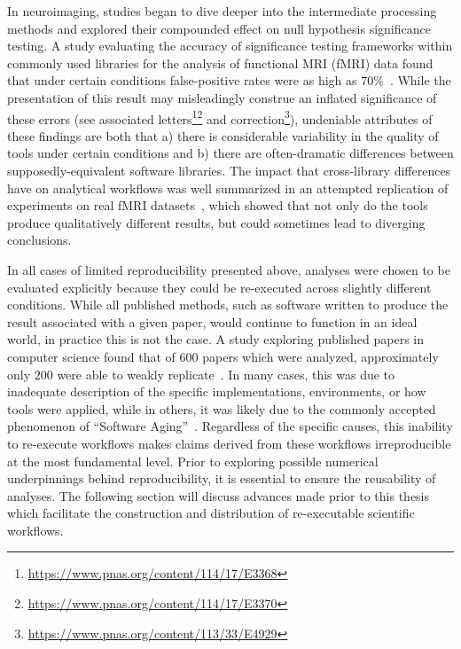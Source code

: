 In neuroimaging, studies began to dive deeper into the intermediate processing methods and explored their compounded
effect on null hypothesis significance testing. A study evaluating the accuracy of significance testing frameworks within
commonly used libraries for the analysis of functional MRI (fMRI) data found that under certain conditions false-positive
rates were as high as $70\%$~\cite{eklund2016cluster}. While the presentation of this result may misleadingly construe an
inflated significance of these errors (see associated
letters\footnote{\url{https://www.pnas.org/content/114/17/E3368}}\footnote{\url{https://www.pnas.org/content/114/17/E3370}}
and correction\footnote{\url{https://www.pnas.org/content/113/33/E4929}}), undeniable attributes of these findings are
both that a) there is considerable variability in the quality of tools under certain conditions and b) there are
often-dramatic differences between supposedly-equivalent software libraries. The impact that cross-library differences have
on analytical workflows was well summarized in an attempted replication of experiments on real fMRI
datasets~\cite{bowring2019exploring}, which showed that not only do the tools produce qualitatively different results,
but could sometimes lead to diverging conclusions.

In all cases of limited reproducibility presented above, analyses were chosen to be evaluated explicitly because they
could be re-executed across slightly different conditions. While all published methods, such as software written to
produce the result associated with a given paper, would continue to function in an ideal world, in practice this is not
the case. A study exploring published papers in computer science found that of $600$ papers which were analyzed,
approximately only $200$ were able to weakly replicate~\cite{collberg2016repeatability}. In many cases, this was due to
inadequate description of the specific implementations, environments, or how tools were applied, while in others, it was
likely due to the commonly accepted phenomenon of ``Software Aging''~\cite{parnas1994software}. Regardless of the specific
causes, this inability to re-execute workflows makes claims derived from these workflows irreproducible at the most
fundamental level. Prior to exploring possible numerical underpinnings behind reproducibility, it is essential to ensure
the reusability of analyses. The following section will discuss advances made prior to this thesis which facilitate
the construction and distribution of re-executable scientific workflows.

